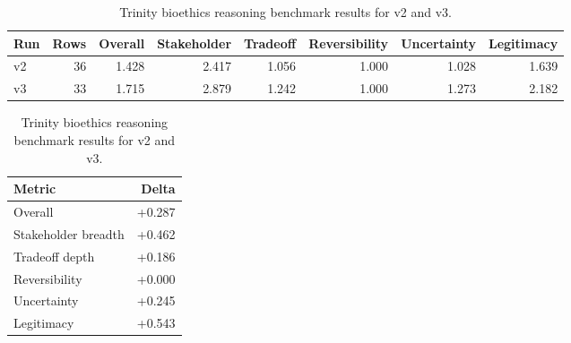 \begin{table}[t]
\centering
\caption{Trinity bioethics reasoning benchmark results for v2 and v3.}
\label{tab:trinity_reasoning_results}
\begin{tabular}{lrrrrrrr}
\hline
Run & Rows & Overall & Stakeholder & Tradeoff & Reversibility & Uncertainty & Legitimacy \\
\hline
v2 & 36 & 1.428 & 2.417 & 1.056 & 1.000 & 1.028 & 1.639 \\
v3 & 33 & 1.715 & 2.879 & 1.242 & 1.000 & 1.273 & 2.182 \\
\hline
\end{tabular}
\vspace{0.6em}

\centering
\begin{tabular}{lr}
\hline
Metric & Delta \\
\hline
Overall & +0.287 \\
Stakeholder breadth & +0.462 \\
Tradeoff depth & +0.186 \\
Reversibility & +0.000 \\
Uncertainty & +0.245 \\
Legitimacy & +0.543 \\
\hline
\end{tabular}
\end{table}
